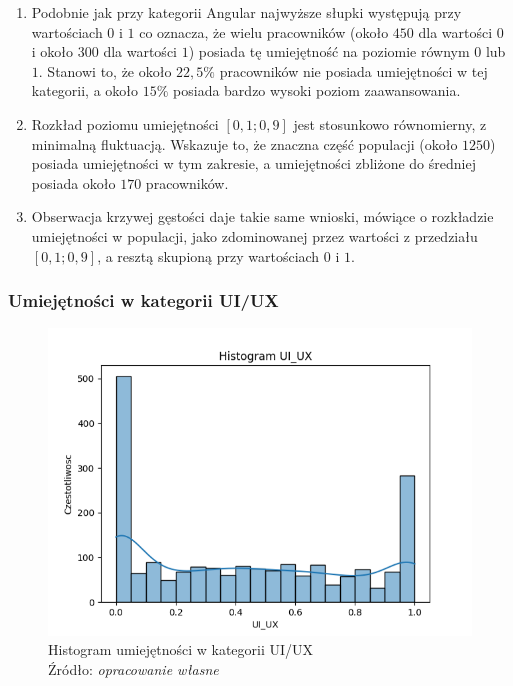         \begin{enumerate}
            \item Podobnie jak przy kategorii Angular najwyższe słupki występują przy wartościach $0$ i $1$ co oznacza, że wielu pracowników (około $450$ dla wartości $0$ i około $300$ dla wartości $1$) posiada tę umiejętność na poziomie równym $0$ lub $1$. Stanowi to, że około $22,5\%$ pracowników nie posiada umiejętności w tej kategorii, a około $15\%$ posiada bardzo wysoki poziom zaawansowania.
            \item Rozkład poziomu umiejętności $[0,1; 0,9]$ jest stosunkowo równomierny, z minimalną fluktuacją. Wskazuje to, że znaczna część populacji (około $1250$) posiada umiejętności w tym zakresie, a umiejętności zbliżone do średniej posiada około $170$ pracowników.
            \item Obserwacja krzywej gęstości daje takie same wnioski, mówiące o rozkładzie umiejętności w populacji, jako zdominowanej przez wartości z przedziału $[0,1; 0,9]$, a resztą skupioną przy wartościach $0$ i $1$.
        \end{enumerate}
        
        \subsubsection{Umiejętności w kategorii UI/UX}
        \begin{figure}[H]
            \centering
            \includegraphics[width=\linewidth]{chapters/Images/hist_uiux.png}
            \cprotect\caption{Histogram umiejętności w kategorii UI/UX\\ Źródło:\textit{ opracowanie własne}}
            \label{fig:hist_uiux}
        \end{figure}

